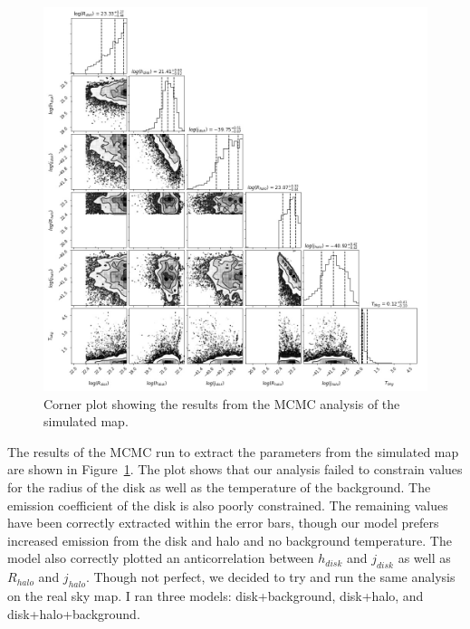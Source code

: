 \documentclass[letterpaper, 10pt]{article}
\begin{document}
\newpage

\begin{figure}[H]
\begin{center}
\includegraphics[width=\textwidth]{corner_simdata.jpg}
\caption{Corner plot showing the results from the MCMC analysis of the simulated map.}
\label{mcmcsim}
\end{center}
\end{figure}

The results of the MCMC run to extract the parameters from the simulated map are shown in Figure~\ref{mcmcsim}. The plot shows that our analysis failed to constrain values for the radius of the disk as well as the temperature of the background. The emission coefficient of the disk is also poorly constrained. The remaining values have been correctly extracted within the error bars, though our model prefers increased emission from the disk and halo and no background temperature. The model also correctly plotted an anticorrelation between $h_{disk}$ and $j_{disk}$ as well as $R_{halo}$ and $j_{halo}$. Though not perfect, we decided to try and run the same analysis on the real sky map. I ran three models: disk+background, disk+halo, and disk+halo+background.

\newpage
\end{document}
